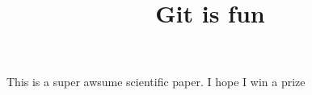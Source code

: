 \documentclass[10px]{article}
\title{Git is fun}
\begin{document}
	\maketitle

	This is a super awsume scientific paper.
	I hope I win a prize
\end{document}
